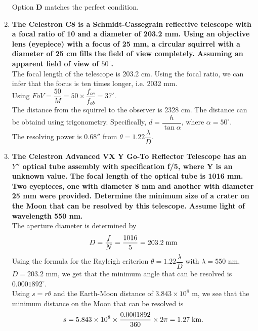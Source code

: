 \documentclass[a4paper,12pt]{extarticle}
\begin{document}
\begin{enumerate}
Option \textbf{D} matches the perfect condition.

\item \textbf{The Celestron C8 is a Schmidt-Cassegrain reflective telescope with a focal ratio of 10 and a diameter of 203.2 mm. Using an objective lens (eyepiece) with a focus of 25 mm, a circular squirrel with a diameter of 25 cm fills the field of view completely. Assuming an apparent field of view of $50^\circ$.}\\

The focal length of the telescope is 203.2 cm. Using the focal ratio, we can infer that the focus is ten times longer, i.e.
2032 mm.\\

Using $FoV =\dfrac{50}{M}=50\times \dfrac{f_{oc}}{f_{ob}}=37'$.\\

The distance from the squirrel to the observer is 2328 cm. The distance can be obtaind using trigonometry. Specifically, $d=\dfrac{h}{\tan \alpha}$, where $\alpha = 50^\circ$.\\

The resolving power is $0.68''$ from $\theta =1.22\dfrac{\lambda}{D}$. \\

\item \textbf{The Celestron Advanced VX Y Go-To Reflector Telescope has an $Y''$ optical tube assembly with specification f/5, where Y is an unknown value. The focal length of the optical tube is 1016 mm. Two eyepieces, one with diameter 8 mm and another with diameter 25 mm were provided. Determine the minimum size of a crater on the Moon that can be resolved by this telescope. Assume light of wavelength 550 nm.}\\

The aperture diameter is determined by
$$D=\frac{f}{N}=\frac{1016}{5}= 203.2 \; \rm mm$$
Using the formula for the Rayleigh criterion $\theta =1.22\dfrac{\lambda}{D}$ with $\lambda= 550$ nm, $D = 203.2$ mm, we get that the minimum angle that can be resolved is $0.0001892^\circ$.\\

Using $s = r\theta$ and the Earth-Moon distance of $3.843\times 10^8$ m, we see that the minimum distance on the Moon that can be resolved is
$$s=5.843\times 10^8 \times  \frac{0.0001892}{360}\times 2\pi =1.27\; \rm km.$$
\end{enumerate}
\end{document}
